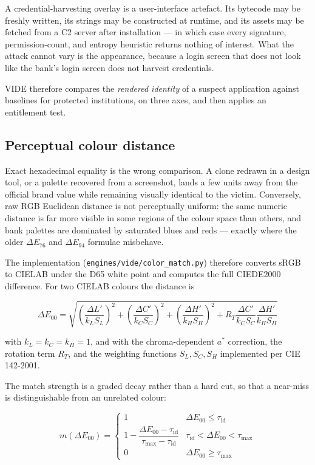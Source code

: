 \documentclass{article}
\begin{document}
A credential-harvesting overlay is a user-interface artefact. Its bytecode may
be freshly written, its strings may be constructed at runtime, and its assets
may be fetched from a C2 server after installation --- in which case every
signature, permission-count, and entropy heuristic returns nothing of interest.
What the attack cannot vary is the appearance, because a login screen that does
not look like the bank's login screen does not harvest credentials.

VIDE therefore compares the \emph{rendered identity} of a suspect application
against baselines for protected institutions, on three axes, and then applies an
entitlement test.

\subsection{Perceptual colour distance}
\label{ssec:vide-color}

Exact hexadecimal equality is the wrong comparison. A clone redrawn in a design
tool, or a palette recovered from a screenshot, lands a few units away from the
official brand value while remaining visually identical to the victim.
Conversely, raw RGB Euclidean distance is not perceptually uniform: the same
numeric distance is far more visible in some regions of the colour space than
others, and bank palettes are dominated by saturated blues and reds --- exactly
where the older $\Delta E_{76}$ and $\Delta E_{94}$ formulae misbehave.

The implementation (\texttt{engines/vide/color\_match.py}) therefore converts
sRGB to CIELAB under the D65 white point and computes the full CIEDE2000
difference. For two CIELAB colours the distance is

\begin{equation}
\Delta E_{00} = \sqrt{
\left(\frac{\Delta L'}{k_L S_L}\right)^{2} +
\left(\frac{\Delta C'}{k_C S_C}\right)^{2} +
\left(\frac{\Delta H'}{k_H S_H}\right)^{2} +
R_T \frac{\Delta C'}{k_C S_C}\frac{\Delta H'}{k_H S_H}}
\label{eq:de2000}
\end{equation}

with $k_L = k_C = k_H = 1$, and with the chroma-dependent $a^*$ correction,
the rotation term $R_T$, and the weighting functions $S_L, S_C, S_H$
implemented per CIE 142-2001.

The match strength is a graded decay rather than a hard cut, so that a
near-miss is distinguishable from an unrelated colour:

\begin{equation}
m(\Delta E_{00}) =
\begin{cases}
1 & \Delta E_{00} \le \tau_{\mathrm{id}} \\[4pt]
1 - \dfrac{\Delta E_{00} - \tau_{\mathrm{id}}}{\tau_{\max} - \tau_{\mathrm{id}}}
  & \tau_{\mathrm{id}} < \Delta E_{00} < \tau_{\max} \\[8pt]
0 & \Delta E_{00} \ge \tau_{\max}
\end{cases}
\label{eq:matchscore}
\end{equation}
\end{document}
